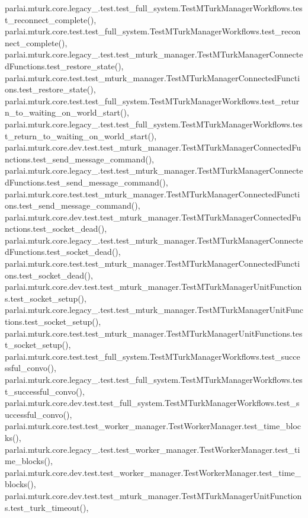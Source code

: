 parlai.\+mturk.\+core.\+legacy\+\_.\+test.\+test\+\_\+full\+\_\+system.\+Test\+M\+Turk\+Manager\+Workflows.\+test\+\_\+reconnect\+\_\+complete(), parlai.\+mturk.\+core.\+test.\+test\+\_\+full\+\_\+system.\+Test\+M\+Turk\+Manager\+Workflows.\+test\+\_\+reconnect\+\_\+complete(), parlai.\+mturk.\+core.\+legacy\+\_.\+test.\+test\+\_\+mturk\+\_\+manager.\+Test\+M\+Turk\+Manager\+Connected\+Functions.\+test\+\_\+restore\+\_\+state(), parlai.\+mturk.\+core.\+test.\+test\+\_\+mturk\+\_\+manager.\+Test\+M\+Turk\+Manager\+Connected\+Functions.\+test\+\_\+restore\+\_\+state(), parlai.\+mturk.\+core.\+test.\+test\+\_\+full\+\_\+system.\+Test\+M\+Turk\+Manager\+Workflows.\+test\+\_\+return\+\_\+to\+\_\+waiting\+\_\+on\+\_\+world\+\_\+start(), parlai.\+mturk.\+core.\+legacy\+\_.\+test.\+test\+\_\+full\+\_\+system.\+Test\+M\+Turk\+Manager\+Workflows.\+test\+\_\+return\+\_\+to\+\_\+waiting\+\_\+on\+\_\+world\+\_\+start(), parlai.\+mturk.\+core.\+dev.\+test.\+test\+\_\+mturk\+\_\+manager.\+Test\+M\+Turk\+Manager\+Connected\+Functions.\+test\+\_\+send\+\_\+message\+\_\+command(), parlai.\+mturk.\+core.\+legacy\+\_.\+test.\+test\+\_\+mturk\+\_\+manager.\+Test\+M\+Turk\+Manager\+Connected\+Functions.\+test\+\_\+send\+\_\+message\+\_\+command(), parlai.\+mturk.\+core.\+test.\+test\+\_\+mturk\+\_\+manager.\+Test\+M\+Turk\+Manager\+Connected\+Functions.\+test\+\_\+send\+\_\+message\+\_\+command(), parlai.\+mturk.\+core.\+dev.\+test.\+test\+\_\+mturk\+\_\+manager.\+Test\+M\+Turk\+Manager\+Connected\+Functions.\+test\+\_\+socket\+\_\+dead(), parlai.\+mturk.\+core.\+legacy\+\_.\+test.\+test\+\_\+mturk\+\_\+manager.\+Test\+M\+Turk\+Manager\+Connected\+Functions.\+test\+\_\+socket\+\_\+dead(), parlai.\+mturk.\+core.\+test.\+test\+\_\+mturk\+\_\+manager.\+Test\+M\+Turk\+Manager\+Connected\+Functions.\+test\+\_\+socket\+\_\+dead(), parlai.\+mturk.\+core.\+dev.\+test.\+test\+\_\+mturk\+\_\+manager.\+Test\+M\+Turk\+Manager\+Unit\+Functions.\+test\+\_\+socket\+\_\+setup(), parlai.\+mturk.\+core.\+legacy\+\_.\+test.\+test\+\_\+mturk\+\_\+manager.\+Test\+M\+Turk\+Manager\+Unit\+Functions.\+test\+\_\+socket\+\_\+setup(), parlai.\+mturk.\+core.\+test.\+test\+\_\+mturk\+\_\+manager.\+Test\+M\+Turk\+Manager\+Unit\+Functions.\+test\+\_\+socket\+\_\+setup(), parlai.\+mturk.\+core.\+test.\+test\+\_\+full\+\_\+system.\+Test\+M\+Turk\+Manager\+Workflows.\+test\+\_\+successful\+\_\+convo(), parlai.\+mturk.\+core.\+legacy\+\_.\+test.\+test\+\_\+full\+\_\+system.\+Test\+M\+Turk\+Manager\+Workflows.\+test\+\_\+successful\+\_\+convo(), parlai.\+mturk.\+core.\+dev.\+test.\+test\+\_\+full\+\_\+system.\+Test\+M\+Turk\+Manager\+Workflows.\+test\+\_\+successful\+\_\+convo(), parlai.\+mturk.\+core.\+test.\+test\+\_\+worker\+\_\+manager.\+Test\+Worker\+Manager.\+test\+\_\+time\+\_\+blocks(), parlai.\+mturk.\+core.\+legacy\+\_.\+test.\+test\+\_\+worker\+\_\+manager.\+Test\+Worker\+Manager.\+test\+\_\+time\+\_\+blocks(), parlai.\+mturk.\+core.\+dev.\+test.\+test\+\_\+worker\+\_\+manager.\+Test\+Worker\+Manager.\+test\+\_\+time\+\_\+blocks(), parlai.\+mturk.\+core.\+dev.\+test.\+test\+\_\+mturk\+\_\+manager.\+Test\+M\+Turk\+Manager\+Unit\+Functions.\+test\+\_\+turk\+\_\+timeout(), 
